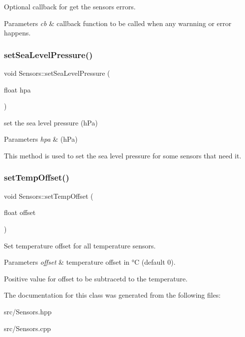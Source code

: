 Optional callback for get the sensors errors. 


\begin{DoxyParams}{Parameters}
{\em cb} & callback function to be called when any warnning or error happens. \\
\hline
\end{DoxyParams}
\mbox{\label{classSensors_a8fe6e43b99919f6c481792f0c0de8c50}} 
\subsubsection{\texorpdfstring{set\+Sea\+Level\+Pressure()}{setSeaLevelPressure()}}
{\footnotesize\ttfamily void Sensors\+::set\+Sea\+Level\+Pressure (\begin{DoxyParamCaption}\item[{float}]{hpa }\end{DoxyParamCaption})}



set the sea level pressure (h\+Pa) 


\begin{DoxyParams}{Parameters}
{\em hpa} & (h\+Pa)\\
\hline
\end{DoxyParams}
This method is used to set the sea level pressure for some sensors that need it. \mbox{\label{classSensors_a122c0d2922d2a80984e8a3ac21b883c3}} 
\subsubsection{\texorpdfstring{set\+Temp\+Offset()}{setTempOffset()}}
{\footnotesize\ttfamily void Sensors\+::set\+Temp\+Offset (\begin{DoxyParamCaption}\item[{float}]{offset }\end{DoxyParamCaption})}



Set temperature offset for all temperature sensors. 


\begin{DoxyParams}{Parameters}
{\em offset} & temperature offset in °C (default 0).\\
\hline
\end{DoxyParams}
Positive value for offset to be subtracetd to the temperature. 

The documentation for this class was generated from the following files\+:\begin{DoxyCompactItemize}
\item 
src/Sensors.\+hpp\item 
src/Sensors.\+cpp\end{DoxyCompactItemize}
